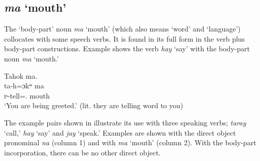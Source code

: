 \newpage  
\subsection{\textit{ma} ‘mouth’}\label{sec:9.3.3}\label{sec:9.3.1.3}

The ‘body-part’ noun \textit{ma} ‘mouth’ (which also means ‘word’ and ‘language’) collocates with some speech verbs. It is found in its full form in the verb plus body-part constructions. Example  shows the verb \textit{hay} ‘say’ with the body-part noun \textit{ma} ‘mouth.’ 

\ea \label{ex:9:57}
Tahok  ma.\\
\gll  ta-h=ɔkʷ    ma\\
      \textsc{p}-tell={\twoS}.{\IO}    mouth\\
\glt  ‘You are being greeted.’ (lit. they are telling word to you) 
\z

The example pairs shown in  illustrate its use with three speaking verbs; \textit{taray} ‘call,’ \textit{hay} ‘say’ and \textit{jay} ‘speak.’ Examples are shown with the direct object pronominal \textit{na} (column 1) and with \textit{ma} ‘mouth’ (column 2). With the body-part incorporation, there can be no other direct object. 

